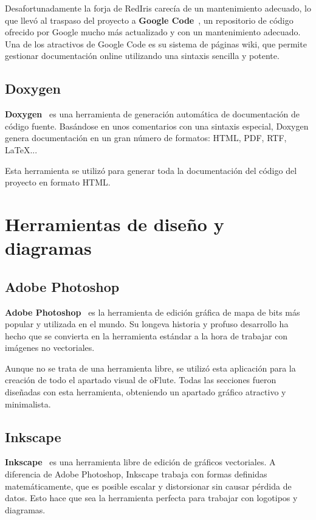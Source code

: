Desafortunadamente la forja de RedIris carecía de un mantenimiento adecuado, lo
que llevó al traspaso del proyecto a \textbf{Google Code}~\cite{ofluteforja}, un
repositorio de código ofrecido por Google mucho más actualizado y con un
mantenimiento adecuado. Una de los atractivos de Google Code es su sistema de
páginas wiki, que permite gestionar documentación online utilizando una sintaxis
sencilla y potente.

\subsection{Doxygen}
\textbf{Doxygen}~\cite{doxygen} es una herramienta de generación automática de
documentación de código fuente. Basándose en unos comentarios con una sintaxis
especial, Doxygen genera documentación en un gran número de formatos: HTML, PDF,
RTF, \LaTeX...

Esta herramienta se utilizó para generar toda la documentación del código del
proyecto en formato \ac{HTML}.


\section{Herramientas de diseño y diagramas}

\subsection{Adobe Photoshop}
\textbf{Adobe Photoshop}~\cite{photoshop} es la herramienta de edición gráfica de mapa de bits
más popular y utilizada en el mundo. Su longeva historia y profuso desarrollo ha
hecho que se convierta en la herramienta estándar a la hora de trabajar con
imágenes no vectoriales.

Aunque no se trata de una herramienta libre, se utilizó esta aplicación para la
creación de todo el apartado visual de oFlute. Todas las secciones fueron
diseñadas con esta herramienta, obteniendo un apartado gráfico atractivo y
minimalista.

\subsection{Inkscape}
\textbf{Inkscape}~\cite{inkscape} es una herramienta libre de edición de gráficos vectoriales. A
diferencia de Adobe Photoshop, Inkscape trabaja con formas definidas
matemáticamente, que es posible escalar y distorsionar sin causar pérdida de
datos. Esto hace que sea la herramienta perfecta para trabajar con logotipos y
diagramas.


